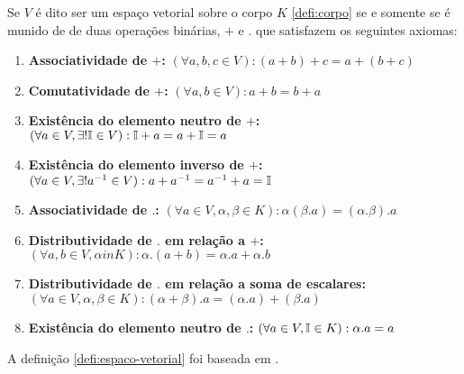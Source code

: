 \documentclass[../../main]{subfiles}
\begin{document}
    \begin{defi}\label{defi:espaco-vetorial}
        Se $V$ é dito ser um espaço vetorial sobre o corpo $K$ \ref{defi:corpo} se e somente se é munido de de duas operações binárias, $+$ e $.$ que satisfazem os seguintes axiomas:


        \begin{enumerate}
            \item \textbf{Associatividade de $+$:} $(\forall a,b,c \in V): (a+b)+c=a+(b+c)$

            \item \textbf{Comutatividade de $+$:} $(\forall a,b \in V): a+b=b+a$

            \item \textbf{Existência do elemento neutro de $+$:} $(\forall a \in V, \exists! \mathbb{I} \in V): \mathbb{I}+a=a+\mathbb{I}=a$

            \item \textbf{Existência do elemento inverso de $+$:} $(\forall a \in V, \exists! a^{-1} \in V): a+a^{-1}=a^{-1}+a=\mathbb{I}$

            \item \textbf{Associatividade de $.$:} $(\forall a \in V, \alpha, \beta \in K): \alpha(\beta.a) = (\alpha.\beta).a $

            \item \textbf{Distributividade de $.$ em relação a $+$:} $(\forall a, b \in V, \alpha in K): \alpha.(a+b)=\alpha.a+\alpha.b$

            \item \textbf{Distributividade de $.$ em relação a soma de escalares:} $(\forall a \in V, \alpha, \beta \in K): (\alpha+\beta).a=(\alpha.a)+(\beta.a)$

            \item \textbf{Existência do elemento neutro de $.$:} $(\forall a \in V, \mathbb{I} \in K): \alpha.a=a$
        \end{enumerate}
    \end{defi}

    A definição \ref{defi:espaco-vetorial} foi baseada em \cite{lima-2012}.
\end{document}
